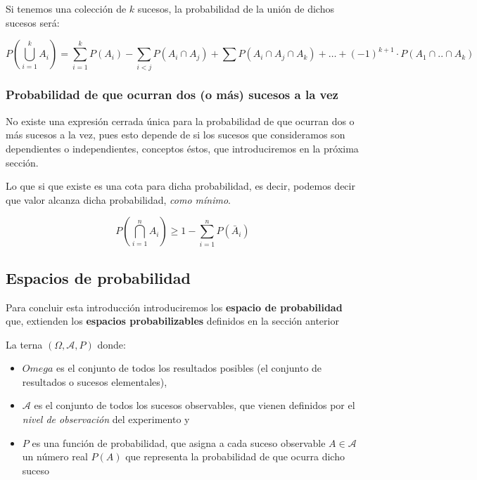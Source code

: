 \documentclass[
]{article}
\providecommand{\tightlist}{%
  \setlength{\itemsep}{0pt}\setlength{\parskip}{0pt}}
\begin{document}
Si tenemos una colección de \(k\) sucesos, la probabilidad de la unión de
dichos sucesos será:

\[
P\left(\bigcup_{i=1}^{k} A_{i}\right)=\sum_{i=1}^{k} P\left(A_{i}\right)-\sum_{i<j} P\left(A_{i} \cap A_{j}\right)+\sum P\left(A_{i} \cap A_{j} \cap A_{k}\right)+\ldots+(-1)^{k+1} \cdot P\left(A_{1} \cap . . \cap A_{k}\right)
\]

\subsubsection{Probabilidad de que ocurran dos (o más) sucesos a la vez}\label{probabilidad-de-que-ocurran-dos-o-muxe1s-sucesos-a-la-vez}

No existe una expresión cerrada única para la probabilidad de que ocurran dos o más sucesos a la vez, pues esto depende de si los sucesos que consideramos son dependientes o independientes, conceptos éstos, que introduciremos en la próxima sección.

Lo que si que existe es una cota para dicha probabilidad, es decir, podemos decir que valor alcanza dicha probabilidad, \emph{como mínimo}.

\[
P\left(\bigcap_{i=1}^{n} A_{i}\right) \geq 1-\sum_{i=1}^{n} P\left(\bar{A}_{i}\right)
\]

\subsection{Espacios de probabilidad}\label{espacios-de-probabilidad}

Para concluir esta introducción introduciremos los \textbf{espacio de probabilidad} que, extienden los \textbf{espacios probabilizables} definidos en la sección anterior

La terna \((\Omega, \mathcal{A}, P)\) donde:

\begin{itemize}
\tightlist
\item
  \(Omega\) es el conjunto de todos los resultados posibles (el conjunto de resultados o sucesos elementales),
\item
  \(\mathcal{A}\) es el conjunto de todos los sucesos observables, que vienen definidos por el \emph{nivel de observación} del experimento y
\item
  \(P\) es una función de probabilidad, que asigna a cada suceso observable \(A \in \mathcal{A}\) un número real \(P(A)\) que representa la probabilidad de que ocurra dicho suceso
\end{itemize}
\end{document}
